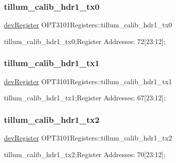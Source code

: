 \subsubsection{\texorpdfstring{tillum\+\_\+calib\+\_\+hdr1\+\_\+tx0}{tillum\_calib\_hdr1\_tx0}}
{\footnotesize\ttfamily \mbox{\hyperlink{classdev_register}{dev\+Register}} O\+P\+T3101\+Registers\+::tillum\+\_\+calib\+\_\+hdr1\+\_\+tx0}



tillum\+\_\+calib\+\_\+hdr1\+\_\+tx0;Register Addresses\+: 72\mbox{[}23\+:12\mbox{]}; 

\mbox{\label{class_o_p_t3101_registers_a9aa4c81deafadd6f337ae463292022a7}} 
\subsubsection{\texorpdfstring{tillum\+\_\+calib\+\_\+hdr1\+\_\+tx1}{tillum\_calib\_hdr1\_tx1}}
{\footnotesize\ttfamily \mbox{\hyperlink{classdev_register}{dev\+Register}} O\+P\+T3101\+Registers\+::tillum\+\_\+calib\+\_\+hdr1\+\_\+tx1}



tillum\+\_\+calib\+\_\+hdr1\+\_\+tx1;Register Addresses\+: 67\mbox{[}23\+:12\mbox{]}; 

\mbox{\label{class_o_p_t3101_registers_ad9bcba2b13c84e3c6d5864022c8fa95f}} 
\subsubsection{\texorpdfstring{tillum\+\_\+calib\+\_\+hdr1\+\_\+tx2}{tillum\_calib\_hdr1\_tx2}}
{\footnotesize\ttfamily \mbox{\hyperlink{classdev_register}{dev\+Register}} O\+P\+T3101\+Registers\+::tillum\+\_\+calib\+\_\+hdr1\+\_\+tx2}



tillum\+\_\+calib\+\_\+hdr1\+\_\+tx2;Register Addresses\+: 70\mbox{[}23\+:12\mbox{]}; 

